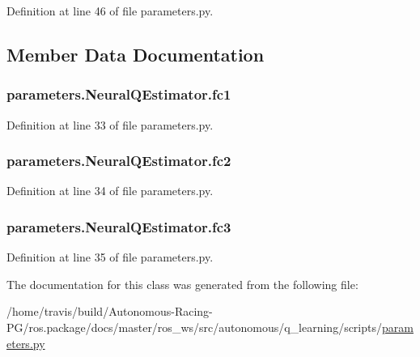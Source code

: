 Definition at line 46 of file parameters.\+py.



\subsection{Member Data Documentation}
\subsubsection[{\texorpdfstring{fc1}{fc1}}]{\setlength{\rightskip}{0pt plus 5cm}parameters.\+Neural\+Q\+Estimator.\+fc1}\hypertarget{classparameters_1_1_neural_q_estimator_ab0fb7d0e286565a2531f3ddb126e2592}{}\label{classparameters_1_1_neural_q_estimator_ab0fb7d0e286565a2531f3ddb126e2592}


Definition at line 33 of file parameters.\+py.

\subsubsection[{\texorpdfstring{fc2}{fc2}}]{\setlength{\rightskip}{0pt plus 5cm}parameters.\+Neural\+Q\+Estimator.\+fc2}\hypertarget{classparameters_1_1_neural_q_estimator_abd606711b39f423590adacb37c5b55d0}{}\label{classparameters_1_1_neural_q_estimator_abd606711b39f423590adacb37c5b55d0}


Definition at line 34 of file parameters.\+py.

\subsubsection[{\texorpdfstring{fc3}{fc3}}]{\setlength{\rightskip}{0pt plus 5cm}parameters.\+Neural\+Q\+Estimator.\+fc3}\hypertarget{classparameters_1_1_neural_q_estimator_ac48aa201a71a0e25e8ca7274a2cc5733}{}\label{classparameters_1_1_neural_q_estimator_ac48aa201a71a0e25e8ca7274a2cc5733}


Definition at line 35 of file parameters.\+py.



The documentation for this class was generated from the following file\+:\begin{DoxyCompactItemize}
\item 
/home/travis/build/\+Autonomous-\/\+Racing-\/\+P\+G/ros.\+package/docs/master/ros\+\_\+ws/src/autonomous/q\+\_\+learning/scripts/\hyperlink{parameters_8py}{parameters.\+py}\end{DoxyCompactItemize}
